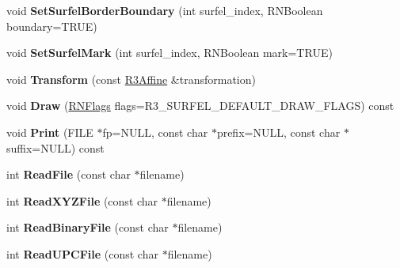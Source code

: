 \begin{DoxyCompactItemize}
\item 
void {\bfseries Set\+Surfel\+Border\+Boundary} (int surfel\+\_\+index, R\+N\+Boolean boundary=T\+R\+UE)\hypertarget{class_r3_surfel_block_ac8faf3eb15bbfdc5b14751cb031e42e6}{}\label{class_r3_surfel_block_ac8faf3eb15bbfdc5b14751cb031e42e6}

\item 
void {\bfseries Set\+Surfel\+Mark} (int surfel\+\_\+index, R\+N\+Boolean mark=T\+R\+UE)\hypertarget{class_r3_surfel_block_a2d56720ff538d1c335545b3da99d82aa}{}\label{class_r3_surfel_block_a2d56720ff538d1c335545b3da99d82aa}

\item 
void {\bfseries Transform} (const \hyperlink{class_r3_affine}{R3\+Affine} \&transformation)\hypertarget{class_r3_surfel_block_a666c94adbe833e117c7f9ae521a4bb01}{}\label{class_r3_surfel_block_a666c94adbe833e117c7f9ae521a4bb01}

\item 
void {\bfseries Draw} (\hyperlink{class_r_n_flags}{R\+N\+Flags} flags=R3\+\_\+\+S\+U\+R\+F\+E\+L\+\_\+\+D\+E\+F\+A\+U\+L\+T\+\_\+\+D\+R\+A\+W\+\_\+\+F\+L\+A\+GS) const \hypertarget{class_r3_surfel_block_a4985800cd95ca5d7fc76e239eb3c7986}{}\label{class_r3_surfel_block_a4985800cd95ca5d7fc76e239eb3c7986}

\item 
void {\bfseries Print} (F\+I\+LE $\ast$fp=N\+U\+LL, const char $\ast$prefix=N\+U\+LL, const char $\ast$suffix=N\+U\+LL) const \hypertarget{class_r3_surfel_block_aec5bd6bb3959b5dbd546db1401779c56}{}\label{class_r3_surfel_block_aec5bd6bb3959b5dbd546db1401779c56}

\item 
int {\bfseries Read\+File} (const char $\ast$filename)\hypertarget{class_r3_surfel_block_a168b865888b3b95bb6907de331f78527}{}\label{class_r3_surfel_block_a168b865888b3b95bb6907de331f78527}

\item 
int {\bfseries Read\+X\+Y\+Z\+File} (const char $\ast$filename)\hypertarget{class_r3_surfel_block_ad3076fbef84b4be3682fb5408c211554}{}\label{class_r3_surfel_block_ad3076fbef84b4be3682fb5408c211554}

\item 
int {\bfseries Read\+Binary\+File} (const char $\ast$filename)\hypertarget{class_r3_surfel_block_af7db8a357a11a2cca4915a6b645fa56c}{}\label{class_r3_surfel_block_af7db8a357a11a2cca4915a6b645fa56c}

\item 
int {\bfseries Read\+U\+P\+C\+File} (const char $\ast$filename)\hypertarget{class_r3_surfel_block_a747ec18600e8fd6b4ef721b130ab7a6f}{}\label{class_r3_surfel_block_a747ec18600e8fd6b4ef721b130ab7a6f}


\end{DoxyCompactItemize}
